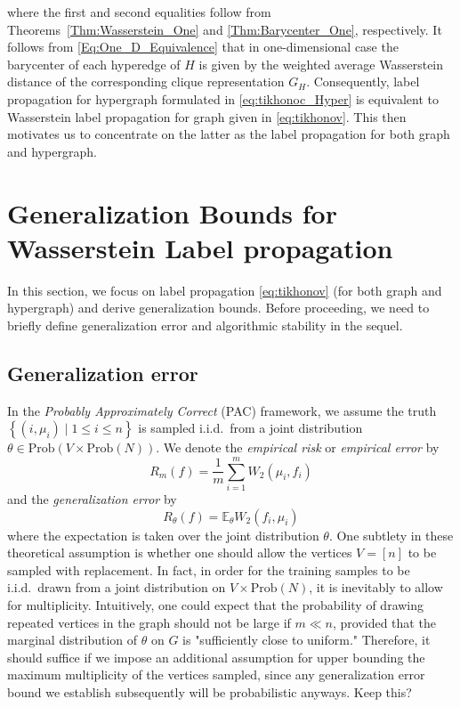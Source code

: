\documentclass[letterpaper]{article} %
\begin{document}
where the first and second equalities follow from Theorems~\ref{Thm:Wasserstein_One} and \ref{Thm:Barycenter_One}, respectively. It follows from \eqref{Eq:One_D_Equivalence} that in one-dimensional case the barycenter of each hyperedge of $H$ is given by the weighted average Wasserstein distance of the corresponding clique representation $G_H$. Consequently, label propagation for hypergraph formulated in \eqref{eq:tikhonoc_Hyper} is 
equivalent to Wasserstein label propagation for graph given in  \eqref{eq:tikhonov}. This then motivates us to concentrate on the latter as the label propagation for both graph and hypergraph.

\section{Generalization Bounds for Wasserstein Label propagation}
In this section, we focus on label propagation \eqref{eq:tikhonov} (for both graph and hypergraph) and derive generalization bounds. Before proceeding, we need to briefly define generalization error and algorithmic stability in the sequel.
\subsection{Generalization error}
In the \emph{Probably Approximately Correct} (PAC) framework, we assume the truth $\left\{ \left( i,\mu_i \right)\mid 1\leq i\leq n \right\}$ is sampled i.i.d.\ from a joint distribution $\theta\in \mathrm{Prob}\left( V\times \mathrm{Prob}\left( N \right) \right)$. We denote the \emph{empirical risk} or \emph{empirical error} by
\begin{equation}
  \label{eq:empirical-risk}
  R_m \left( f \right)=\frac{1}{m}\sum_{i=1}^mW_2 \left( \mu_i, f_i \right)
\end{equation}
and the \emph{generalization error} by
\begin{equation}
  \label{eq:generalization-error}
  R_{\theta} \left( f \right)=\mathbb{E}_{\theta} W_2 \left( f_i, \mu_i \right)
\end{equation}
where the expectation is taken over the joint distribution $\theta$.
One subtlety in these theoretical assumption is whether one should allow the vertices $V=\left[ n \right]$ to be sampled with replacement. In fact, in order for the training samples to be i.i.d.\ drawn from a joint distribution on $V\times \mathrm{Prob}\left( N \right)$, it is inevitably to allow for multiplicity. Intuitively, one could expect that the probability of drawing repeated vertices in the graph should not be large if $m\ll n$, provided that the marginal distribution of $\theta$ on $G$ is "sufficiently close to uniform." Therefore, it should suffice if we impose an additional assumption for upper bounding the maximum multiplicity of the vertices sampled, since any generalization error bound we establish subsequently will be probabilistic anyways. {\color{blue} Keep this?}
\end{document}
